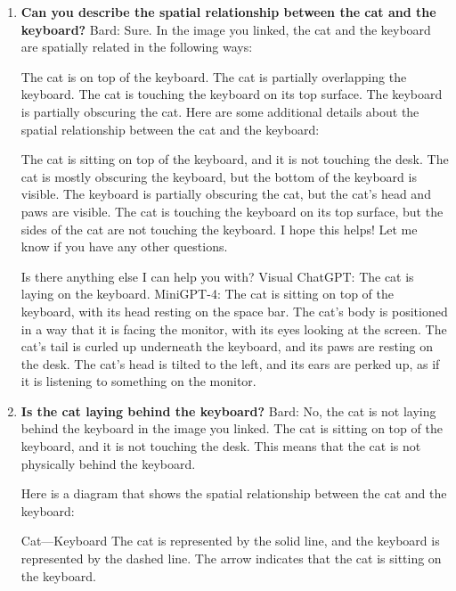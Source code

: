     \begin{enumerate}
        \item \textbf{Can you describe the spatial relationship between the cat and the keyboard?}
        \subitem Bard: 
        Sure. In the image you linked, the cat and the keyboard are spatially related in the following ways:
        
        The cat is on top of the keyboard.
        The cat is partially overlapping the keyboard.
        The cat is touching the keyboard on its top surface.
        The keyboard is partially obscuring the cat.
        Here are some additional details about the spatial relationship between the cat and the keyboard:
        
        The cat is sitting on top of the keyboard, and it is not touching the desk.
        The cat is mostly obscuring the keyboard, but the bottom of the keyboard is visible.
        The keyboard is partially obscuring the cat, but the cat's head and paws are visible.
        The cat is touching the keyboard on its top surface, but the sides of the cat are not touching the keyboard.
        I hope this helps! Let me know if you have any other questions.
        
        Is there anything else I can help you with?
        \subitem Visual ChatGPT: The cat is laying on the keyboard.
        \subitem MiniGPT-4: The cat is sitting on top of the keyboard, with its head resting on the space bar. The cat’s body is positioned in a way that it is facing the monitor, with its eyes looking at the screen. The cat’s tail is curled up underneath the keyboard, and its paws are resting on the desk. The cat’s head is tilted to the left, and its ears are perked up, as if it is listening to something on the monitor.
        \item \textbf{Is the cat laying behind the keyboard?}
        \subitem Bard: 
        No, the cat is not laying behind the keyboard in the image you linked. The cat is sitting on top of the keyboard, and it is not touching the desk. This means that the cat is not physically behind the keyboard.
        
        Here is a diagram that shows the spatial relationship between the cat and the keyboard:
        
        Cat---Keyboard
        The cat is represented by the solid line, and the keyboard is represented by the dashed line. The arrow indicates that the cat is sitting on the keyboard.
        

\end{enumerate}
